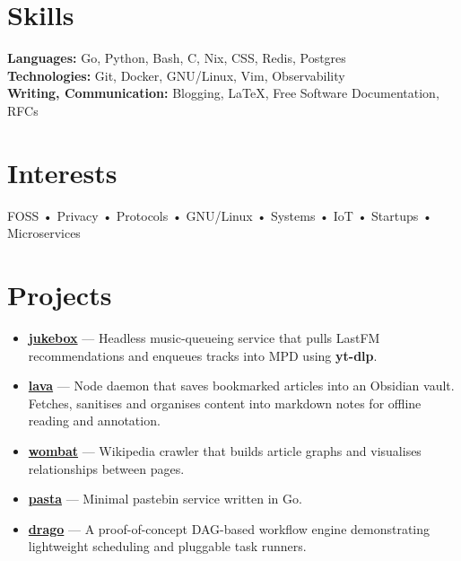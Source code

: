 \documentclass[a4,12pt]{article}
\begin{document}
\section{Skills}
\textbf{Languages:} Go, Python, Bash, C, Nix, CSS, Redis, Postgres \\
\textbf{Technologies:} Git, Docker, GNU/Linux, Vim, Observability \\
\textbf{Writing, Communication:} Blogging, \LaTeX, Free Software Documentation, RFCs

\section{Interests}
FOSS
• Privacy
• Protocols
• GNU/Linux
• Systems
• IoT
• Startups
• Microservices

\section{Projects}
\begin{small}
\begin{itemize}[nolistsep, nosep, partopsep=0pt, leftmargin=1.2em, labelsep=0.6em, itemsep=0pt, topsep=0pt, parsep=0pt]
	\item \textbf{\href{https://github.com/polarhive/jukebox}{jukebox}} --- Headless music-queueing service that pulls LastFM recommendations and enqueues tracks into MPD using \textbf{yt-dlp}.
	\item \textbf{\href{https://polarhive.net/lava}{lava}} --- Node daemon that saves bookmarked articles into an Obsidian vault. Fetches, sanitises and organises content into markdown notes for offline reading and annotation.
	\item \textbf{\href{https://github.com/polarhive/wombat}{wombat}} --- Wikipedia crawler that builds article graphs and visualises relationships between pages.
	\item \textbf{\href{https://polarhive.net/pasta}{pasta}} --- Minimal pastebin service written in Go.
	\item \textbf{\href{https://github.com/polarhive/drago}{drago}} --- A proof-of-concept DAG-based workflow engine demonstrating lightweight scheduling and pluggable task runners.
\end{itemize}
\end{small}
\end{document}
